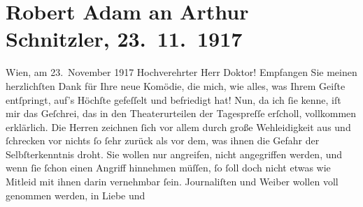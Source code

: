 

         \renewcommand{\erwaehnteOrte}{Orte: Wien}
         \renewcommand{\erwaehnteWerke}{Werke: Fink und Fliederbusch. Komödie in drei Akten}
               \section[Robert Adam an Arthur Schnitzler, 23. 11. 1917]{ Robert Adam an Arthur Schnitzler, 23. 11. 1917}\nopagebreak{}\rehead{ }\begin{ledgroupsized}[t]{13cm}\normalsize\beginnumbering \toendnotes[C]{\smallbreak\pagebreak[2]} 
\toendnotes[C]{\smallbreak}\pstart
           \raggedleft{}{\pb}Wien, am 23. November 1917\pend
           \pstart\center{}Hochverehrter Herr Doktor!\pend\pstart
           Empfangen Sie meinen herzlichſten Dank für Ihre neue Komödie, die mich, wie alles, was Ihrem Geiſte entſpringt,
               auf’s Höchſte gefeſſelt und befriedigt hat!\pend
           \pstart
           Nun, da ich ſie kenne, iſt mir das Geſchrei, das in den Theaterurteilen der
               Tagespreſſe erſcholl, vollkommen erklärlich. Die Herren zeichnen ſich vor allem durch
               große Wehleidigkeit aus und ſchrecken vor nichts ſo ſehr zurück als vor dem, was
               ihnen die Gefahr der Selbſterkenntnis droht. Sie wollen nur angreifen, nicht
               angegriffen werden, und wenn ſie ſchon einen Angriff hinnehmen müſſen, ſo ſoll doch
               nicht etwas wie Mitleid mit ihnen {\pb}darin
               vernehmbar ſein. Journaliſten und Weiber wollen voll genommen werden, in Liebe und

\end{ledgroupsized}
